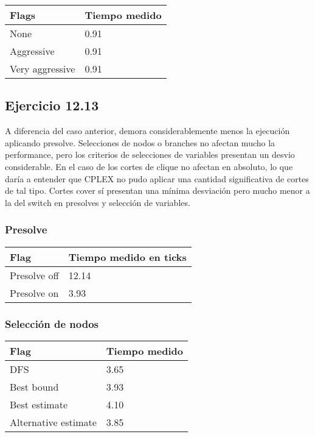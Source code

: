     \begin{center}
        \begin{tabular}{ | m{7em} | m{5cm} | }
        \hline
        Flags  & Tiempo medido \\
        \hline
        None  & 0.91 \\
        \hline
        Aggressive  & 0.91 \\
        \hline
        Very aggressive  & 0.91 \\
        \hline
        \end{tabular}
    \end{center}


\subsection{Ejercicio 12.13}
A diferencia del caso anterior, demora considerablemente menos la ejecución aplicando presolve.
Selecciones de nodos o branches no afectan mucho la performance, pero los criterios de selecciones de variables presentan un desvio considerable.
En el caso de los cortes de clique no afectan en absoluto, lo que daría a entender que CPLEX no pudo aplicar una cantidad significativa de cortes de tal tipo. Cortes cover sí presentan una mínima desviación pero mucho menor a la del switch en presolves y selección de variables.

\subsubsection{Presolve}

    \begin{center}
        \begin{tabular}{ | m{7em} | m{5cm} | }
        \hline
        Flag & Tiempo medido en ticks \\
        \hline
        Presolve off & 12.14 \\
        \hline
        Presolve on & 3.93 \\
        \hline
        \end{tabular}
    \end{center}

\subsubsection{Selección de nodos}

    \begin{center}
        \begin{tabular}{ | m{11em} | m{5cm} | }
        \hline
        Flag & Tiempo medido \\
        \hline
        DFS & 3.65 \\
        \hline
        Best bound & 3.93 \\
        \hline
        Best estimate & 4.10 \\
        \hline
        Alternative estimate & 3.85 \\
        \hline
        \end{tabular}
    \end{center}


